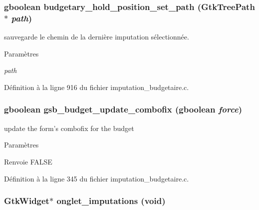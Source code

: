 \subsubsection[{budgetary\_\-hold\_\-position\_\-set\_\-path}]{\setlength{\rightskip}{0pt plus 5cm}gboolean budgetary\_\-hold\_\-position\_\-set\_\-path (GtkTreePath $\ast$ {\em path})}\label{imputation__budgetaire_8h_a6228c4caafe41ed3474c70918e98cfac}
sauvegarde le chemin de la dernière imputation sélectionnée.


\begin{DoxyParams}{Paramètres}
\item[{\em path}]\end{DoxyParams}


Définition à la ligne 916 du fichier imputation\_\-budgetaire.c.

\subsubsection[{gsb\_\-budget\_\-update\_\-combofix}]{\setlength{\rightskip}{0pt plus 5cm}gboolean gsb\_\-budget\_\-update\_\-combofix (gboolean {\em force})}\label{imputation__budgetaire_8h_ad363e475c28e0d82a408950418ffb877}
update the form's combofix for the budget


\begin{DoxyParams}{Paramètres}
\item[{\em }]\end{DoxyParams}
\begin{DoxyReturn}{Renvoie}
FALSE 
\end{DoxyReturn}


Définition à la ligne 345 du fichier imputation\_\-budgetaire.c.

\subsubsection[{onglet\_\-imputations}]{\setlength{\rightskip}{0pt plus 5cm}GtkWidget$\ast$ onglet\_\-imputations (void)}\label{imputation__budgetaire_8h_ac694980b7be317dc9bdb169c8afd1876}


